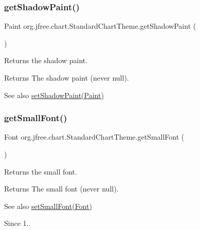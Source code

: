 \subsubsection{\texorpdfstring{get\+Shadow\+Paint()}{getShadowPaint()}}
{\footnotesize\ttfamily Paint org.\+jfree.\+chart.\+Standard\+Chart\+Theme.\+get\+Shadow\+Paint (\begin{DoxyParamCaption}{ }\end{DoxyParamCaption})}

Returns the shadow paint.

\begin{DoxyReturn}{Returns}
The shadow paint (never {\ttfamily null}).
\end{DoxyReturn}
\begin{DoxySeeAlso}{See also}
\mbox{\hyperlink{classorg_1_1jfree_1_1chart_1_1_standard_chart_theme_a0ff8611c67fdb30d2cc36ab4d568b6f5}{set\+Shadow\+Paint(\+Paint)}} 
\end{DoxySeeAlso}
\mbox{\label{classorg_1_1jfree_1_1chart_1_1_standard_chart_theme_a118c992e7711e55b0e878892ff7e73e9}} 
\subsubsection{\texorpdfstring{get\+Small\+Font()}{getSmallFont()}}
{\footnotesize\ttfamily Font org.\+jfree.\+chart.\+Standard\+Chart\+Theme.\+get\+Small\+Font (\begin{DoxyParamCaption}{ }\end{DoxyParamCaption})}

Returns the small font.

\begin{DoxyReturn}{Returns}
The small font (never {\ttfamily null}).
\end{DoxyReturn}
\begin{DoxySeeAlso}{See also}
\mbox{\hyperlink{classorg_1_1jfree_1_1chart_1_1_standard_chart_theme_a2ccfadc13b45218fac64a11c83adf070}{set\+Small\+Font(\+Font)}}
\end{DoxySeeAlso}
\begin{DoxySince}{Since}
1.. 
\end{DoxySince}
\mbox{\label{classorg_1_1jfree_1_1chart_1_1_standard_chart_theme_ada6593c77d8f7fb0dd9bf3c3f9fffd79}} 
